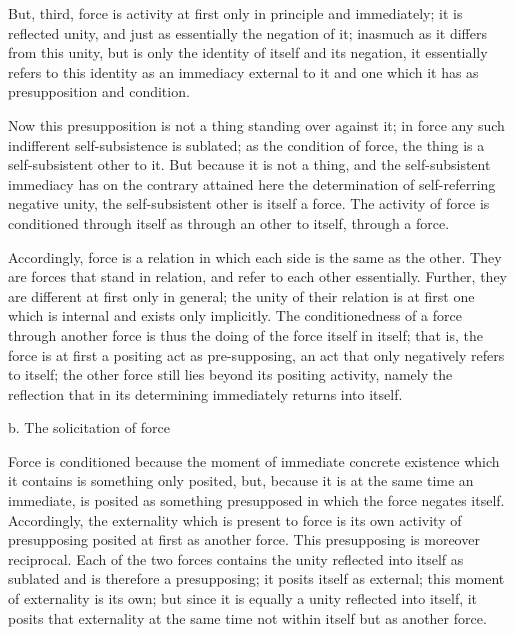 But, third, force is activity at first only
in principle and immediately;
it is reflected unity,
and just as essentially the negation of it;
inasmuch as it differs from this unity,
but is only the identity of itself and its negation,
it essentially refers to this identity as
an immediacy external to it
and one which it has as
presupposition and condition.

Now this presupposition is not
a thing standing over against it;
in force any such indifferent
self-subsistence is sublated;
as the condition of force,
the thing is a self-subsistent other to it.
But because it is not a thing,
and the self-subsistent immediacy has
on the contrary attained here the
determination of self-referring negative unity,
the self-subsistent other is itself a force.
The activity of force is conditioned
through itself as through an other to itself,
through a force.

Accordingly, force is a relation
in which each side is the same as the other.
They are forces that stand in relation,
and refer to each other essentially.
Further, they are different at first only in general;
the unity of their relation
is at first one which is internal and exists only implicitly.
The conditionedness of a force through another force is
thus the doing of the force itself in itself;
that is, the force is at first a positing act as pre-supposing,
an act that only negatively refers to itself;
the other force still lies beyond its positing activity,
namely the reflection that in its determining
immediately returns into itself.

b. The solicitation of force

Force is conditioned because
the moment of immediate concrete existence
which it contains is something only posited,
but, because it is at the same time an immediate,
is posited as something presupposed in which
the force negates itself.
Accordingly, the externality
which is present to force is its
own activity of presupposing posited
at first as another force.
This presupposing is moreover reciprocal.
Each of the two forces contains the unity
reflected into itself as sublated
and is therefore a presupposing;
it posits itself as external;
this moment of externality is its own;
but since it is equally a unity reflected into itself,
it posits that externality at the same time
not within itself but as another force.

